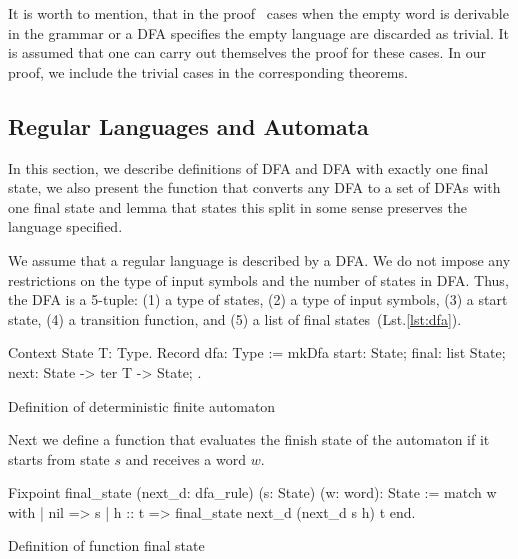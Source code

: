 It is worth to mention, that in the proof~\cite{beigelproof} cases when the empty word is derivable in the grammar or a DFA specifies the empty language are discarded as trivial.
It is assumed that one can carry out themselves the proof for these cases.
In our proof, we include the trivial cases in the corresponding theorems.

\subsection{Regular Languages and Automata}

In this section, we describe definitions of DFA and DFA with exactly one final state, we also present the function that converts any DFA to a set of DFAs with one final state and lemma that states this split in some sense preserves the language specified.

We assume that a regular language is described by a DFA. We do not impose any restrictions on the type of input symbols and the number of states in DFA. Thus, the DFA is a 5-tuple: (1) a type of states, (2) a type of input symbols, (3) a start state, (4) a transition function, and (5) a list of final states~(Lst.\ref{lst:dfa}).

\begin{listing}[h]
    \begin{pyglist}[language=coq, numbers=none, numbersep=5pt]
  Context {State T: Type}.
  Record dfa: Type :=
    mkDfa {
      start: State;
      final: list State;
      next: State -> ter T -> State;
    }.
    \end{pyglist}
    \caption{Definition of deterministic finite automaton}
    \label{lst:dfa}
\end{listing}

Next we define a function that evaluates the finish state of the automaton if it starts from state $s$ and receives a word $w$. 

\begin{listing}[h]
    \begin{pyglist}[language=coq, numbers=none, numbersep=5pt]
  Fixpoint final_state 
             (next_d: dfa_rule) 
             (s: State) 
             (w: word): State :=
    match w with
    | nil => s 
    | h :: t => final_state next_d 
                            (next_d s h)
                            t 
    end.
    \end{pyglist}
    \caption{Definition of function final state}
    \label{lst:verbments1}
\end{listing}

